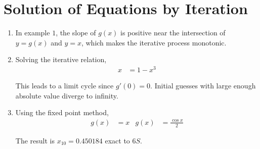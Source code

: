 \section{Solution of Equations by Iteration}

\begin{enumerate}
    \item In example $ 1 $, the slope of $ g(x) $ is positive near the intersection of
          $ y = g(x) $ and $ y = x $, which makes the iterative process monotonic.

    \item Solving the iterative relation,
          \begin{align}
              x & = 1 - x^3
          \end{align}
          \begin{figure}[H]
              \centering
              \anitableeleven
          \end{figure}
          This leads to a limit cycle since $ g'(0) = 0 $. Initial guesses with
          large enough absolute value diverge to infinity.

    \item Using the fixed point method,
          \begin{align}
              g(x) & = x & g(x) & = \frac{\cos x}{2}
          \end{align}
          \begin{figure}[H]
              \centering
              \anitableeleven
          \end{figure}
          The result is $ x_{10} = 0.450184 $ exact to $ 6S $.


\end{enumerate}
